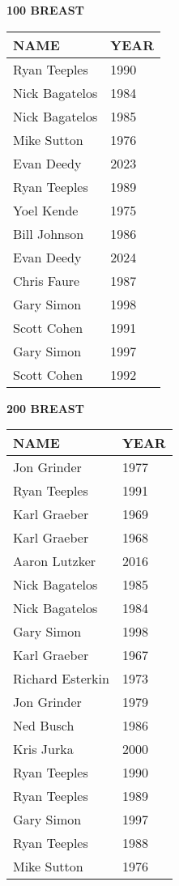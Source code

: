 \begin{minipage}[t]{0.48\textwidth}
\centering
\textbf{100 BREAST}\\[0.05cm]
\begin{tabular}{@{}p{2.8cm}p{1.2cm}@{}}
\hline
\textbf{NAME} & \textbf{YEAR} \\
\hline
Ryan Teeples & 1990 \\
Nick Bagatelos & 1984 \\
Nick Bagatelos & 1985 \\
Mike Sutton & 1976 \\
Evan Deedy & 2023 \\
Ryan Teeples & 1989 \\
Yoel Kende & 1975 \\
Bill Johnson & 1986 \\
Evan Deedy & 2024 \\
Chris Faure & 1987 \\
Gary Simon & 1998 \\
Scott Cohen & 1991 \\
Gary Simon & 1997 \\
Scott Cohen & 1992 \\
\hline
\end{tabular}
\end{minipage}\hfill
\begin{minipage}[t]{0.48\textwidth}
\centering
\textbf{200 BREAST}\\[0.05cm]
\begin{tabular}{@{}p{2.8cm}p{1.2cm}@{}}
\hline
\textbf{NAME} & \textbf{YEAR} \\
\hline
Jon Grinder & 1977 \\
Ryan Teeples & 1991 \\
Karl Graeber & 1969 \\
Karl Graeber & 1968 \\
Aaron Lutzker & 2016 \\
Nick Bagatelos & 1985 \\
Nick Bagatelos & 1984 \\
Gary Simon & 1998 \\
Karl Graeber & 1967 \\
Richard Esterkin & 1973 \\
Jon Grinder & 1979 \\
Ned Busch & 1986 \\
Kris Jurka & 2000 \\
Ryan Teeples & 1990 \\
Ryan Teeples & 1989 \\
Gary Simon & 1997 \\
Ryan Teeples & 1988 \\
Mike Sutton & 1976 \\
\hline
\end{tabular}
\end{minipage}

